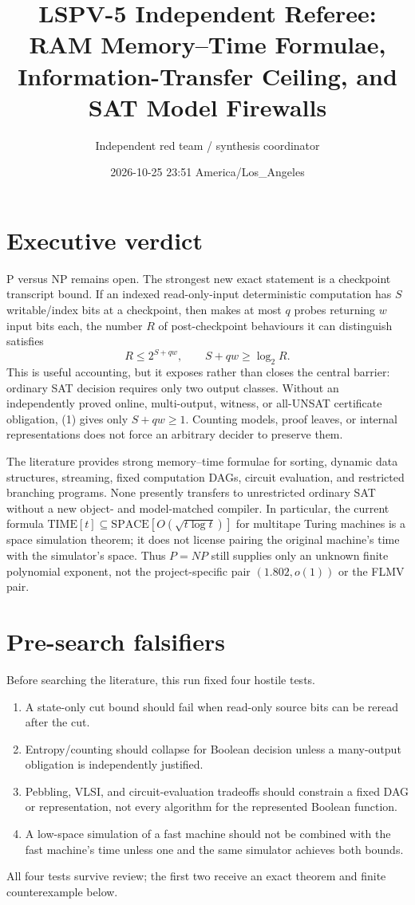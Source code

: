 \documentclass[11pt]{article}
\title{LSPV-5 Independent Referee: RAM Memory--Time Formulae,\\
Information-Transfer Ceiling, and SAT Model Firewalls}
\author{Independent red team / synthesis coordinator}
\date{2026-10-25 23:51 America/Los\_Angeles}
\begin{document}
\maketitle

\section*{Executive verdict}
P versus NP remains open.  The strongest new exact statement is a checkpoint
transcript bound.  If an indexed read-only-input deterministic computation has
$S$ writable/index bits at a checkpoint, then makes at most $q$ probes returning
$w$ input bits each, the number $R$ of post-checkpoint behaviours it can distinguish
satisfies
\[
             R\le 2^{S+qw},\qquad S+qw\ge\log_2 R.                 \tag{1}
\]
This is useful accounting, but it exposes rather than closes the central barrier:
ordinary SAT decision requires only two output classes.  Without an independently
proved online, multi-output, witness, or all-UNSAT certificate obligation, (1) gives
only $S+qw\ge1$.  Counting models, proof leaves, or internal representations does not
force an arbitrary decider to preserve them.

The literature provides strong memory--time formulae for sorting, dynamic data
structures, streaming, fixed computation DAGs, circuit evaluation, and restricted
branching programs.  None presently transfers to unrestricted ordinary SAT without
a new object- and model-matched compiler.  In particular, the current formula
\(\mathrm{TIME}[t]\subseteq\mathrm{SPACE}[O(\sqrt{t\log t})]\) for multitape
Turing machines is a space simulation theorem; it does not license pairing the
original machine's time with the simulator's space.  Thus $P=NP$ still supplies only
an unknown finite polynomial exponent, not the project-specific pair
$(1.802,o(1))$ or the FLMV pair.

\section*{Pre-search falsifiers}
Before searching the literature, this run fixed four hostile tests.
\begin{enumerate}[leftmargin=*]
\item A state-only cut bound should fail when read-only source bits can be reread after
the cut.
\item Entropy/counting should collapse for Boolean decision unless a many-output
obligation is independently justified.
\item Pebbling, VLSI, and circuit-evaluation tradeoffs should constrain a fixed DAG or
representation, not every algorithm for the represented Boolean function.
\item A low-space simulation of a fast machine should not be combined with the fast
machine's time unless one and the same simulator achieves both bounds.
\end{enumerate}
All four tests survive review; the first two receive an exact theorem and finite
counterexample below.
\end{document}
